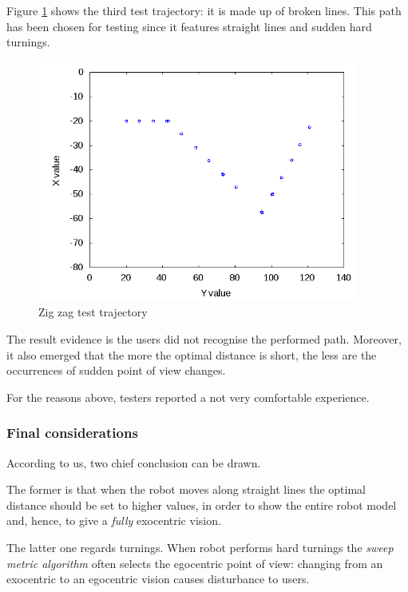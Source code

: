 Figure \ref{fig:zigzagtest} shows the third test trajectory:
it is made up of broken lines. This path has been chosen for testing
since it features straight lines and sudden hard turnings.

\begin{figure}[!h]
  \begin{center}
    \includegraphics[width=300pt]{img/path_session_6.png}
    \caption{Zig zag test trajectory}
    \label{fig:zigzagtest}
  \end{center}
\end{figure}
%


The result evidence is the users did not recognise the performed path.
Moreover, it also emerged that the more the optimal distance is short,
the less are the occurrences of sudden point of view changes.
%

%
For the reasons above, testers reported a not very comfortable experience.


\subsubsection{Final considerations}
\label{subsubsec:finalconsiderations}

According to us, two chief conclusion can be drawn.
%

%
The former is that when the robot moves along straight lines
the optimal distance should be set to higher values, in order
to show the entire robot model and, hence, to give a \textit{fully}
exocentric vision.
%

%
The latter one regards turnings. When robot performs hard turnings
the \textit{sweep metric algorithm} often selects the egocentric
point of view: changing from an exocentric to an egocentric vision
causes disturbance to users.
